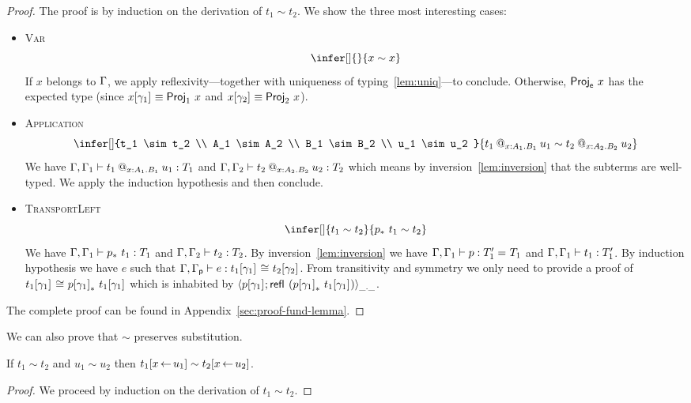\begin{proof}
  The proof is by induction on the derivation of $t_1 \sim t_2$. We show
  the three most interesting cases:

  \begin{itemize}
  \item \textsc{Var}
    \[
      \infer[]
        { }
        {x \sim x}
    \]
    If $x$ belongs to $\Ga$, we apply reflexivity---together with uniqueness of
    typing~\eqref{lem:uniq}---to conclude.
    Otherwise, $\ProjE{x}$ has the expected type (since
    $\llift{\gamma}{}{x} \equiv \ProjO{x}$ and $\rlift{\gamma}{}{x} \equiv \ProjT{x}$).

  \item \textsc{Application}
    \[
      \infer[]
        {t_1 \sim t_2 \\
         A_1 \sim A_2 \\
         B_1 \sim B_2 \\
         u_1 \sim u_2
        }
        {\app{t_1}{x:A_1}{B_1}{u_1} \sim \app{t_2}{x:A_2}{B_2}{u_2}}
    \]
    We have $\isterm{\Ga, \Ga_1}{\app{t_1}{x:A_1}{B_1}{u_1}}{T_1}$ and
    $\isterm{\Ga, \Ga_2}{\app{t_2}{x:A_2}{B_2}{u_2}}{T_2}$ which means by
    inversion~\eqref{lem:inversion} that the subterms are well-typed.
    We apply the induction hypothesis and then conclude.
  \item \textsc{TransportLeft}
    \[
      \infer[]
        {t_1 \sim t_2}
        {\transpo{p}\ t_1 \sim t_2}
    \]
    We have $\isterm{\Ga, \Ga_1}{\transpo{p}\ t_1}{T_1}$ and
    $\isterm{\Ga, \Ga_2}{t_2}{T_2}$.
    By inversion~\eqref{lem:inversion} we have
    $\isterm{\Ga, \Ga_1}{p}{\Eq{}{T_1'}{T_1}}$ and
    $\isterm{\Ga, \Ga_1}{t_1}{T_1'}$.
    By induction hypothesis we have $e$ such that
    $\isterm{\Ga, \Gp}{e}{\Heq{}{\llift{\gamma}{}{t_1}}{}{\rlift{\gamma}{}{t_2}}}$.
    From transitivity and symmetry we only need to provide a proof of
    $\Heq{}{\llift{\gamma}{}{t_1}}{}{\transpo{\llift{\gamma}{}{p}}\ \llift{\gamma}{}{t_1}}$ which is inhabited by
    $\pair{\_}{\_}{\llift{\gamma}{}{p}}{\refl{} (\transpo{\llift{\gamma}{}{p}}\ \llift{\gamma}{}{t_1})}$.
  \end{itemize}

  The complete proof can be found in Appendix~\ref{sec:proof-fund-lemma}.
\end{proof}

We can also prove that $\sim$ preserves substitution.

\begin{lemma}
  If $t_1 \sim t_2$ and $u_1 \sim u_2$ then
  $t_1[x \sto u_1] \sim t_2[x \sto u_2]$.
\end{lemma}

\begin{proof}
  We proceed by induction on the derivation of $t_1 \sim t_2$.
\end{proof}
